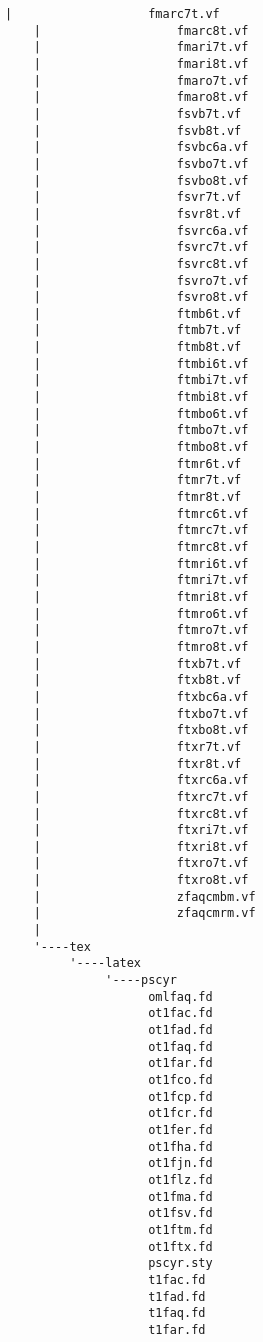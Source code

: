 \begin{lstlisting}[frame=tb, extendedchars=false, breaklines=false, basicstyle=\footnotesize\upshape ,columns=flexible ,keepspaces=true , lineskip={-7.0pt} ]
    |                   fmarc7t.vf
    |                   fmarc8t.vf
    |                   fmari7t.vf
    |                   fmari8t.vf
    |                   fmaro7t.vf
    |                   fmaro8t.vf
    |                   fsvb7t.vf
    |                   fsvb8t.vf
    |                   fsvbc6a.vf
    |                   fsvbo7t.vf
    |                   fsvbo8t.vf
    |                   fsvr7t.vf
    |                   fsvr8t.vf
    |                   fsvrc6a.vf
    |                   fsvrc7t.vf
    |                   fsvrc8t.vf
    |                   fsvro7t.vf
    |                   fsvro8t.vf
    |                   ftmb6t.vf
    |                   ftmb7t.vf
    |                   ftmb8t.vf
    |                   ftmbi6t.vf
    |                   ftmbi7t.vf
    |                   ftmbi8t.vf
    |                   ftmbo6t.vf
    |                   ftmbo7t.vf
    |                   ftmbo8t.vf
    |                   ftmr6t.vf
    |                   ftmr7t.vf
    |                   ftmr8t.vf
    |                   ftmrc6t.vf
    |                   ftmrc7t.vf
    |                   ftmrc8t.vf
    |                   ftmri6t.vf
    |                   ftmri7t.vf
    |                   ftmri8t.vf
    |                   ftmro6t.vf
    |                   ftmro7t.vf
    |                   ftmro8t.vf
    |                   ftxb7t.vf
    |                   ftxb8t.vf
    |                   ftxbc6a.vf
    |                   ftxbo7t.vf
    |                   ftxbo8t.vf
    |                   ftxr7t.vf
    |                   ftxr8t.vf
    |                   ftxrc6a.vf
    |                   ftxrc7t.vf
    |                   ftxrc8t.vf
    |                   ftxri7t.vf
    |                   ftxri8t.vf
    |                   ftxro7t.vf
    |                   ftxro8t.vf
    |                   zfaqcmbm.vf
    |                   zfaqcmrm.vf
    |                   
    '----tex
         '----latex
              '----pscyr
                    omlfaq.fd
                    ot1fac.fd
                    ot1fad.fd
                    ot1faq.fd
                    ot1far.fd
                    ot1fco.fd
                    ot1fcp.fd
                    ot1fcr.fd
                    ot1fer.fd
                    ot1fha.fd
                    ot1fjn.fd
                    ot1flz.fd
                    ot1fma.fd
                    ot1fsv.fd
                    ot1ftm.fd
                    ot1ftx.fd
                    pscyr.sty
                    t1fac.fd
                    t1fad.fd
                    t1faq.fd
                    t1far.fd

\end{lstlisting}
